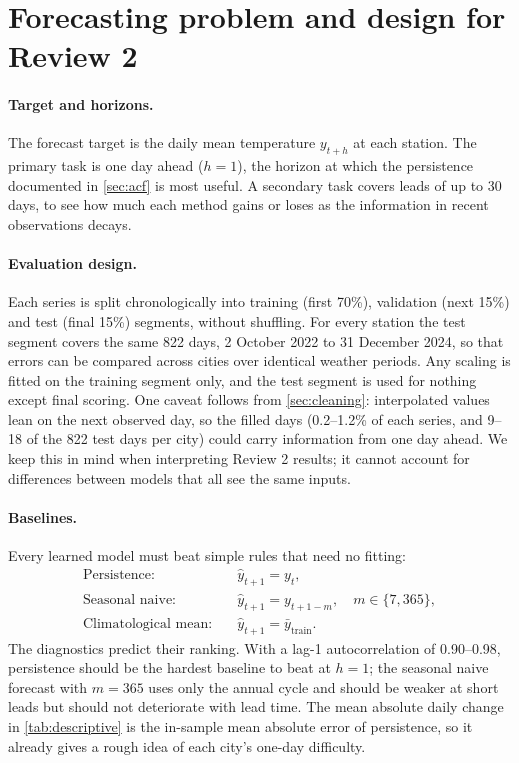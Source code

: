 \documentclass[11pt,a4paper]{article}
\begin{document}
\section{Forecasting problem and design for Review 2}
\label{sec:forecast}

\paragraph{Target and horizons.} The forecast target is the daily mean temperature $y_{t+h}$ at each station. The primary task is one day ahead ($h = 1$), the horizon at which the persistence documented in \cref{sec:acf} is most useful. A secondary task covers leads of up to 30 days, to see how much each method gains or loses as the information in recent observations decays.

\paragraph{Evaluation design.} Each series is split chronologically into training (first 70\%), validation (next 15\%) and test (final 15\%) segments, without shuffling. For every station the test segment covers the same 822 days, 2 October 2022 to 31 December 2024, so that errors can be compared across cities over identical weather periods. Any scaling is fitted on the training segment only, and the test segment is used for nothing except final scoring. One caveat follows from \cref{sec:cleaning}: interpolated values lean on the next observed day, so the filled days (0.2--1.2\% of each series, and 9--18 of the 822 test days per city) could carry information from one day ahead. We keep this in mind when interpreting Review 2 results; it cannot account for differences between models that all see the same inputs.

\paragraph{Baselines.} Every learned model must beat simple rules that need no fitting:
\begin{align}
  \text{Persistence:}\quad & \hat y_{t+1} = y_t, \label{eq:persistence}\\
  \text{Seasonal naive:}\quad & \hat y_{t+1} = y_{t+1-m}, \quad m \in \{7, 365\},\\
  \text{Climatological mean:}\quad & \hat y_{t+1} = \bar y_{\text{train}}.
\end{align}
The diagnostics predict their ranking. With a lag-1 autocorrelation of 0.90--0.98, persistence should be the hardest baseline to beat at $h = 1$; the seasonal naive forecast with $m = 365$ uses only the annual cycle and should be weaker at short leads but should not deteriorate with lead time. The mean absolute daily change in \cref{tab:descriptive} is the in-sample mean absolute error of persistence, so it already gives a rough idea of each city's one-day difficulty.
\end{document}
